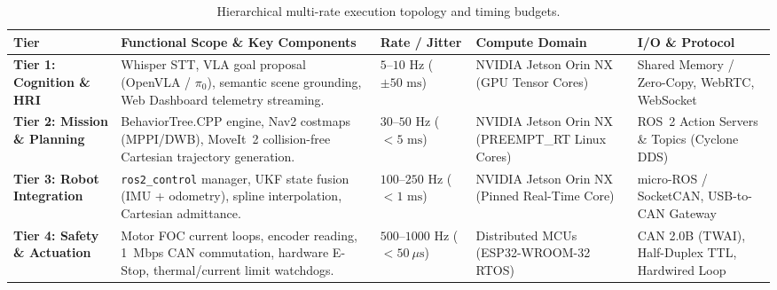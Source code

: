 \begin{table}[ht]
\centering\small
\caption{Hierarchical multi-rate execution topology and timing budgets.}
\label{tab:multi_rate_tiers}
\begin{tabularx}{\textwidth}{@{}p{2.0cm}Xp{2.0cm}p{3.1cm}p{2.9cm}@{}}
\toprule
\textbf{Tier} & \textbf{Functional Scope \& Key Components} & \textbf{Rate / Jitter} & \textbf{Compute Domain} & \textbf{I/O \& Protocol} \\
\midrule
\textbf{Tier 1: Cognition \& HRI} &
Whisper STT, VLA goal proposal (OpenVLA / $\pi_0$), semantic scene grounding, Web Dashboard telemetry streaming. &
$5\text{--}10\text{ Hz}$ \newline ($\pm 50\text{ ms}$) &
NVIDIA Jetson Orin NX (GPU Tensor Cores) &
Shared Memory / Zero-Copy, WebRTC, WebSocket \\
\addlinespace
\textbf{Tier 2: Mission \& Planning} &
BehaviorTree.CPP engine, Nav2 costmaps (MPPI/DWB), MoveIt~2 collision-free Cartesian trajectory generation. &
$30\text{--}50\text{ Hz}$ \newline ($<5\text{ ms}$) &
NVIDIA Jetson Orin NX (PREEMPT\_RT Linux Cores) &
ROS~2 Action Servers \& Topics (Cyclone DDS) \\
\addlinespace
\textbf{Tier 3: Robot Integration} &
\texttt{ros2\_control} manager, UKF state fusion (IMU + odometry), spline interpolation, Cartesian admittance. &
$100\text{--}250\text{ Hz}$ \newline ($<1\text{ ms}$) &
NVIDIA Jetson Orin NX (Pinned Real-Time Core) &
micro-ROS / SocketCAN, USB-to-CAN Gateway \\
\addlinespace
\textbf{Tier 4: Safety \& Actuation} &
Motor FOC current loops, encoder reading, 1~Mbps CAN commutation, hardware E-Stop, thermal/current limit watchdogs. &
$500\text{--}1000\text{ Hz}$ \newline ($<50\ \mu\text{s}$) &
Distributed MCUs (ESP32-WROOM-32 RTOS) &
CAN 2.0B (TWAI), Half-Duplex TTL, Hardwired Loop \\
\bottomrule
\end{tabularx}
\end{table}

